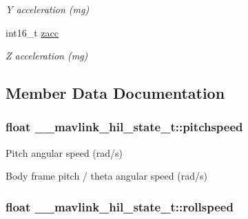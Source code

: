 \begin{DoxyCompactItemize}
\begin{DoxyCompactList}\small\item\em Y acceleration (mg) \end{DoxyCompactList}\item 
\hypertarget{struct____mavlink__hil__state__t_a79b626e6b13844d733a6a6c02e506b90}{int16\+\_\+t \hyperlink{struct____mavlink__hil__state__t_a79b626e6b13844d733a6a6c02e506b90}{zacc}}\label{struct____mavlink__hil__state__t_a79b626e6b13844d733a6a6c02e506b90}

\begin{DoxyCompactList}\small\item\em Z acceleration (mg) \end{DoxyCompactList}\end{DoxyCompactItemize}


\subsection{Member Data Documentation}
\hypertarget{struct____mavlink__hil__state__t_ad7d8b42ee6698e6f892c20146f954d5a}{
\subsubsection[{pitchspeed}]{\setlength{\rightskip}{0pt plus 5cm}float \+\_\+\+\_\+mavlink\+\_\+hil\+\_\+state\+\_\+t\+::pitchspeed}}\label{struct____mavlink__hil__state__t_ad7d8b42ee6698e6f892c20146f954d5a}


Pitch angular speed (rad/s) 

Body frame pitch / theta angular speed (rad/s) \hypertarget{struct____mavlink__hil__state__t_a308aa515448a4d8d25131ce7c0f3254d}{
\subsubsection[{rollspeed}]{\setlength{\rightskip}{0pt plus 5cm}float \+\_\+\+\_\+mavlink\+\_\+hil\+\_\+state\+\_\+t\+::rollspeed}}\label{struct____mavlink__hil__state__t_a308aa515448a4d8d25131ce7c0f3254d}


